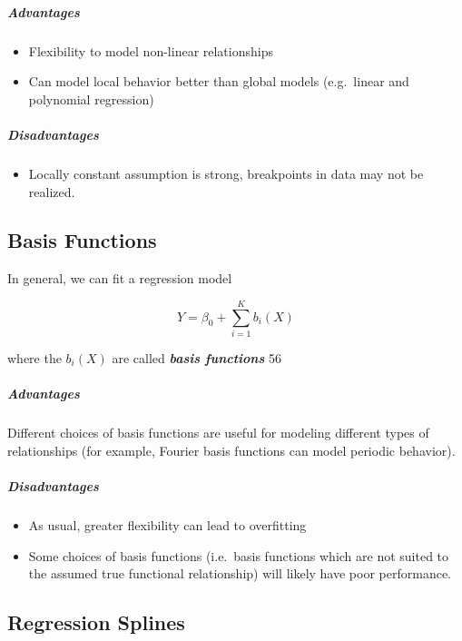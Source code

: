 \documentclass[11pt]{article}
\providecommand{\tightlist}{%
      \setlength{\itemsep}{0pt}\setlength{\parskip}{0pt}}
\begin{document}
    \hypertarget{advantages}{%
\subparagraph{Advantages}\label{advantages}}

    \begin{itemize}
\tightlist
\item
  Flexibility to model non-linear relationships
\item
  Can model local behavior better than global models (e.g.~linear and
  polynomial regression)
\end{itemize}

    \hypertarget{disadvantages}{%
\subparagraph{Disadvantages}\label{disadvantages}}

    \begin{itemize}
\tightlist
\item
  Locally constant assumption is strong, breakpoints in data may not be
  realized.
\end{itemize}

    \hypertarget{basis-functions}{%
\subsection{Basis Functions}\label{basis-functions}}

    In general, we can fit a regression model

\[Y = \beta_0 + \sum_{i=1}^Kb_i(X)\]

where the \(b_i(X)\) are called \textbf{\emph{basis functions}} 56

    \hypertarget{advantages}{%
\subparagraph{Advantages}\label{advantages}}

    Different choices of basis functions are useful for modeling different
types of relationships (for example, Fourier basis functions can model
periodic behavior).

    \hypertarget{disadvantages}{%
\subparagraph{Disadvantages}\label{disadvantages}}

    \begin{itemize}
\tightlist
\item
  As usual, greater flexibility can lead to overfitting
\item
  Some choices of basis functions (i.e.~basis functions which are not
  suited to the assumed true functional relationship) will likely have
  poor performance.
\end{itemize}

    \hypertarget{regression-splines}{%
\subsection{Regression Splines}\label{regression-splines}}
\end{document}
